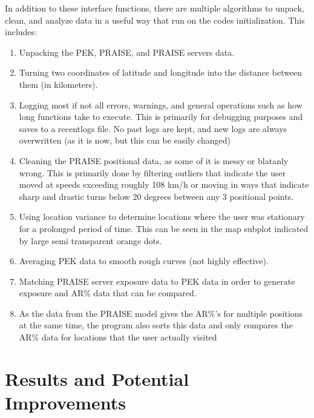 \documentclass{article}
\begin{document}
\begin{multicols}{2}
In addition to these interface functions, there are multiple algorithms to unpack, 
clean, and analyze data in a useful way that run on the codes initialization. This includes: 
\begin{enumerate}
  \item Unpacking the PEK, PRAISE, and PRAISE servers data.
  \item Turning two coordinates of latitude and longitude into the distance between them 
  (in kilometers).
  \item Logging most if not all errors, warnings, and general operations such as how
  long functions take to execute. This is primarily for debugging purposes and saves
  to a recentlogs file. No past logs are kept, and new logs are always overwritten (as 
  it is now, but this can be easily changed)
  \item Cleaning the PRAISE positional data, as some of it is messy or blatanly 
  wrong. This is primarily done by filtering outliers that indicate the user 
  moved at speeds exceeding roughly 108 km/h or moving in ways that indicate sharp 
  and drastic turns below 20 degrees between any 3 positional points.
  \item Using location variance to determine locations where the user was stationary 
  for a prolonged period of time. This can be seen in the map subplot indicated by 
  large semi transparent orange dots.
  \item Averaging PEK data to smooth rough curves (not highly effective).
  \item Matching PRAISE server exposure data to PEK data in order to generate 
  exposure and AR\% data that can be compared. 
  \item As the data from the PRAISE model gives the AR\%'s for multiple positions 
  at the same time, the program also sorts this data and only compares the AR\% data 
  for locations that the user actually visited
\end{enumerate}


\section{Results and Potential Improvements}
\label{section:Results}


\end{multicols}
\end{document}
